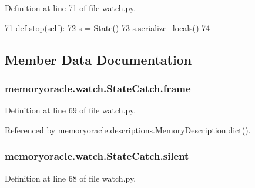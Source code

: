 Definition at line 71 of file watch.\+py.


\begin{DoxyCode}
71     \textcolor{keyword}{def }\hyperlink{classmemoryoracle_1_1watch_1_1StateCatch_ab0da6fca924dccf11ac2c4da2620f211}{stop}(self):
72         s = State()
73         s.serialize\_locals()
74 \end{DoxyCode}


\subsection{Member Data Documentation}
\hypertarget{classmemoryoracle_1_1watch_1_1StateCatch_aa2e2ebcdb40ead7d1114f09d20181e18}{}
\subsubsection[{frame}]{\setlength{\rightskip}{0pt plus 5cm}memoryoracle.\+watch.\+State\+Catch.\+frame}\label{classmemoryoracle_1_1watch_1_1StateCatch_aa2e2ebcdb40ead7d1114f09d20181e18}


Definition at line 69 of file watch.\+py.



Referenced by memoryoracle.\+descriptions.\+Memory\+Description.\+dict().

\hypertarget{classmemoryoracle_1_1watch_1_1StateCatch_aa6aa955a60ded1f2db63e6e6b37d5027}{}
\subsubsection[{silent}]{\setlength{\rightskip}{0pt plus 5cm}memoryoracle.\+watch.\+State\+Catch.\+silent}\label{classmemoryoracle_1_1watch_1_1StateCatch_aa6aa955a60ded1f2db63e6e6b37d5027}


Definition at line 68 of file watch.\+py.

\hypertarget{classmemoryoracle_1_1watch_1_1StateCatch_ac14780996a90f60b06a022254645a332}{}
